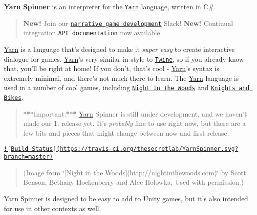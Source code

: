 

{\bfseries \hyperlink{a00040}{Yarn} Spinner} is an interpreter for the \href{https://github.com/infiniteammoinc/Yarn}{\tt Yarn} language, written in C\#.

\begin{quotation}
{\bfseries New!} Join our \href{http://lab.to/narrativegamedev}{\tt narrative game development} Slack! {\bfseries New!} Continual integration \href{https://thesecretlab.github.io/YarnSpinner/html/}{\tt A\-P\-I documentation} now available

\end{quotation}


\hyperlink{a00040}{Yarn} is a language that's designed to make it {\itshape super easy} to create interactive dialogue for games. \hyperlink{a00040}{Yarn}'s very similar in style to \href{http://twinery.org}{\tt Twine}, so if you already know that, you'll be right at home! If you don't, that's cool -\/ \hyperlink{a00040}{Yarn}'s syntax is extremely minimal, and there's not much there to learn. The \hyperlink{a00040}{Yarn} language is used in a number of cool games, including \href{http://nightinthewoods.com}{\tt Night In The Woods} and \href{https://www.kickstarter.com/projects/foamsword/knights-and-bikes}{\tt Knights and Bikes}.

\begin{quotation}
$\ast$$\ast$$\ast$\-Important\-:$\ast$$\ast$$\ast$ \hyperlink{a00040}{Yarn} Spinner is still under development, and we haven't made our 1. release yet. It's {\itshape probably} fine to use right now, but there are a few bits and pieces that might change between now and first release.

\end{quotation}


\href{https://travis-ci.org/thesecretlab/YarnSpinner}{\tt !\mbox{[}Build Status\mbox{]}(https\-://travis-\/ci.\-org/thesecretlab/\-Yarn\-Spinner.\-svg?branch=master)}



\begin{quotation}
(Image from \char`\"{}\mbox{[}\-Night in the Woods\mbox{]}(http\-://nightinthewoods.\-com)\char`\"{} by Scott Benson, Bethany Hockenberry and Alec Holowka. Used with permission.)

\end{quotation}


\hyperlink{a00040}{Yarn} Spinner is designed to be easy to add to Unity games, but it's also intended for use in other contexts as well.

